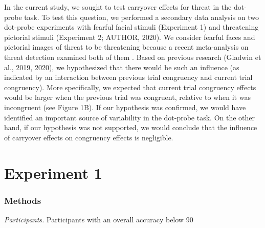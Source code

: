 \documentclass{article}
\begin{document}
	In the current study, we sought to test {\color{4472C4}carryover effects for threat in the }dot-probe task. To test this question, we performed a secondary data analysis on two dot-probe experiments with fearful facial stimuli (Experiment 1) and threatening pictorial stimuli (Experiment 2; AUTHOR, 2020). {\color{4472C4}We consider fearful faces and pictorial images of threat to be threatening because a recent meta-analysis on threat detection examined both of them }\textcite{[object Object]}{\color{4472C4}. }Based on previous research \parencites{Gladwin2019a}{Gladwin2020a}(Gladwin et al., 2019, 2020), we hypothesized that there would be such an influence (as indicated by an interaction between previous trial congruency and current trial congruency). More specifically, we expected that current trial congruency effects would be larger when the previous trial was congruent, relative to when it was incongruent (see Figure 1B). If our hypothesis was confirmed, we would have identified an important source of variability in the dot-probe task. On the other hand, if our hypothesis was not supported, {\color{4472C4}we would conclude that the influence of carryover effects on congruency effects is negligible.}



	\section{Experiment 1}



	\subsubsection{Methods}



	\emph{Participants. }Participants with an overall accuracy below 90%
\end{document}
